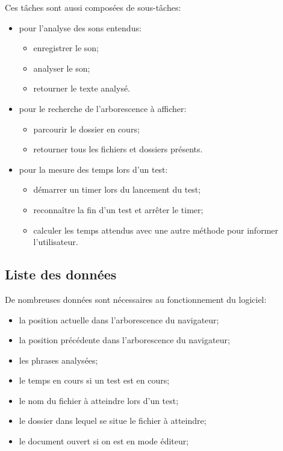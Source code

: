\documentclass[a4paper, 11pt]{report}
\begin{document}
			Ces tâches sont aussi composées de sous-tâches:
			\begin{itemize}
				\item pour l'analyse des sons entendus:
				\begin{itemize}
					\item enregistrer le son;
					\item analyser le son;
					\item retourner le texte analysé.
				\end{itemize}
				\item pour le recherche de l'arborescence à afficher:
				\begin{itemize}
					\item parcourir le dossier en cours;
					\item retourner tous les fichiers et dossiers présents.
				\end{itemize}
				\item pour la mesure des temps lors d'un test:
				\begin{itemize}
					\item démarrer un timer lors du lancement du test;
					\item reconnaître la fin d'un test et arrêter le timer;
					\item calculer les temps attendus avec une autre méthode pour informer l'utilisateur.
				\end{itemize}
			\end{itemize}
			
			\subsection{Liste des données}
			
			De nombreuses données sont nécessaires au fonctionnement du logiciel:
			\begin{itemize}
				\item la position actuelle dans l'arborescence du navigateur;
				\item la position précédente dans l'arborescence du navigateur;
				\item les phrases analysées;
				\item le temps en cours si un test est en cours;
				\item le nom du fichier à atteindre lors d'un test;
				\item le dossier dans lequel se situe le fichier à atteindre;
				\item le document ouvert si on est en mode éditeur;
			\end{itemize}
			
\end{document}

